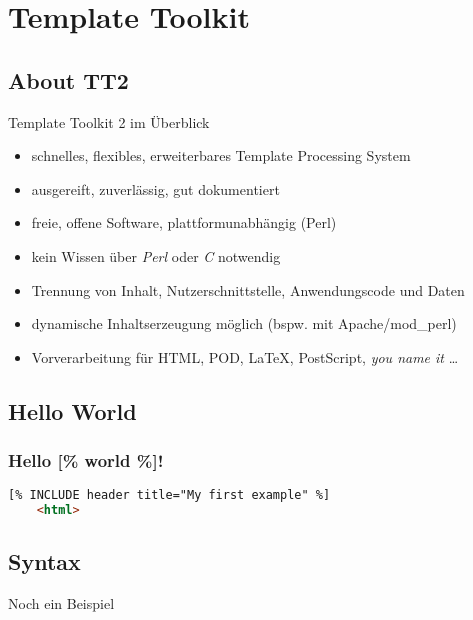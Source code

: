 \documentclass[hyperref={pdfpagelabels=false}]{beamer}
\begin{document}
\section{Template Toolkit}

\subsection{About TT2}

\begin{frame}{Template Toolkit 2 im Überblick}
    \begin{itemize}
        \item schnelles, flexibles, erweiterbares Template Processing System
        \item ausgereift, zuverlässig, gut dokumentiert
        \pause
        \item freie, offene Software, plattformunabhängig (Perl)
        \item kein Wissen über \emph{Perl} oder \emph{C} notwendig
        \pause
        \item Trennung von Inhalt, Nutzerschnittstelle, Anwendungscode und Daten
        \item dynamische Inhaltserzeugung möglich (bspw. mit Apache/mod\_perl)
        \pause
        \item Vorverarbeitung für HTML, POD, \LaTeX, PostScript, \emph{you name it} \dots
    \end{itemize}
\end{frame}

\subsection{Hello World}

\begin{frame}[fragile]
    \frametitle{Hello [\% world \%]!}
    \begin{lstlisting}[language=HTML]
    [% INCLUDE header title="My first example" %]
    <html>
    \end{lstlisting} 
\end{frame}

\subsection{Syntax}

\begin{frame}{Noch ein Beispiel}
\end{frame}
\end{document}

